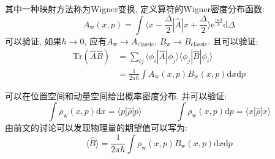         其中一种映射方法称为Wigner变换, 定义算符的Wigner密度分布函数: 
        \begin{equation}
            A_\mathrm{w}(x,p) = \int \langle x - \frac {\Delta}2 | \hat{A} | x + \frac {\Delta}2 \rangle \mathrm{e}^{\frac {\mathrm{i} p \Delta}{\hbar}} \mathrm{d} \Delta
        \end{equation}
        可以验证, 如果$\hbar \to 0$, 应有$A_\mathrm{w} \to A_\mathrm{classic}$, $B_\mathrm{w} \to B_\mathrm{classic}$. 且可以验证:
        \begin{equation}\begin{aligned}
            \mathrm{Tr} (\hat{A}\hat{B}) &= \sum_{ij} \langle \phi_{i} | \hat{A} | \phi_{j} \rangle \langle \phi_{j} | \hat{B} | \phi_{i} \rangle \\
            &= \frac 1{2\pi\hbar} \int A_\mathrm{w}(x,p) B_\mathrm{w}(x,p) \mathrm{d}x \mathrm{d}p
        \end{aligned}\end{equation}

        可以在位置空间和动量空间给出概率密度分布. 并可以验证:
        \begin{equation}
            \int \rho_\mathrm{w}(x,p) \mathrm{d}x = \langle p|\hat{\rho}|p \rangle
            \qquad\qquad
            \int \rho_\mathrm{w}(x,p) \mathrm{d}p = \langle x|\hat{\rho}|x \rangle
        \end{equation}
        由前文的讨论可以发现物理量的期望值可以写为: 
        \begin{equation}
            \langle \hat{B} \rangle = \frac 1{2\pi \hbar} \int \rho_\mathrm{w}(x,p) B_\mathrm{w}(x,p) \mathrm{d}x\mathrm{d}p
        \end{equation}

    
    